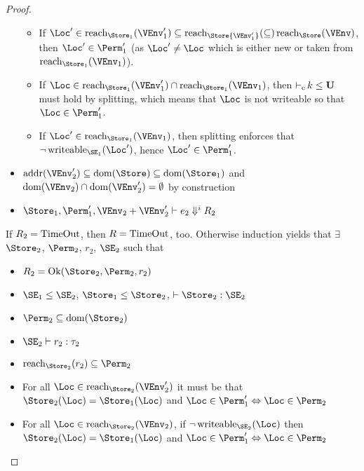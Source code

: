 \begin{proof}
\begin{itemize}
    \begin{itemize}
    \item If $\Loc' \in \Reach{\Store_1}{\VEnv_1'} \subseteq
      \Reach\Store{\VEnv_1'} \subseteq \Reach\Store\VEnv$, then $\Loc'
      \in \Perm_1'$ (as $\Loc' \ne \Loc$ which is either new or taken
      from $\Reach{\Store_1}{\VEnv_1}$).
    \item If
      $\Loc \in \Reach{\Store_1}{\VEnv_1'} \cap
      \Reach{\Store_1}{\VEnv_1}$, then ${\operatorname{\vdash_e} k \le \mathbf{U}}$
      must hold by splitting, which means that $\Loc$ is not writeable
      so that $\Loc\in\Perm_1'$.
    \item If $\Loc' \in \Reach{\Store_1}{\VEnv_1}$, then splitting
      enforces that $\neg\Writeable{\SE_1}{\Loc'}$, hence $\Loc' \in \Perm_1'$.
    \end{itemize}
  \item $\Addresses{\VEnv_2'} \subseteq \Dom{\Store} \subseteq \Dom{\Store_1}$ and
    $\Dom{\VEnv_2} \cap \Dom{\VEnv_2'}=\emptyset$ by construction
  \item $\Store_1, \Perm_1', \VEnv_2 + \VEnv_2' \vdash {e_2}
    \Downarrow^i R_2$
  \end{itemize}
  If $R_2 = \operatorname{TimeOut}$, then $R = \operatorname{TimeOut}$, too.
  Otherwise induction yields that
  $\exists$ $\Store_2$, $\Perm_2$, $r_2$, $\SE_2$ such that
  \begin{itemize}
  \item
    $R_2 = \Ok{\Store_2, \Perm_2, r_2}$  
  \item $\SE_1 \le \SE_2$, $\Store_1 \le \Store_2$,
    $\vdash \Store_2 : \SE_2$ 
  \item $\Perm_2 \subseteq \Dom{\Store_2}$
  \item $\SE_2 \vdash r_2 : \tau_2$
  \item $\Reach{\Store_2}{r_2} \subseteq \Perm_2$
  \item For all $\Loc \in \Reach{\Store_2}{\VEnv_2'}$ it must be that
    $\Store_2 (\Loc) = \Store_1 (\Loc)$
    and $\Loc\in\Perm_1' \Leftrightarrow \Loc\in\Perm_2$ 
  \item For all $\Loc \in \Reach{\Store_2}{\VEnv_2}$,
    if $\neg \Writeable{\SE_2}\Loc $ then
    $\Store_2 (\Loc) = \Store_1 (\Loc)$
    and $\Loc\in\Perm_1' \Leftrightarrow \Loc\in\Perm_2$ 
  \end{itemize}


\end{proof}
